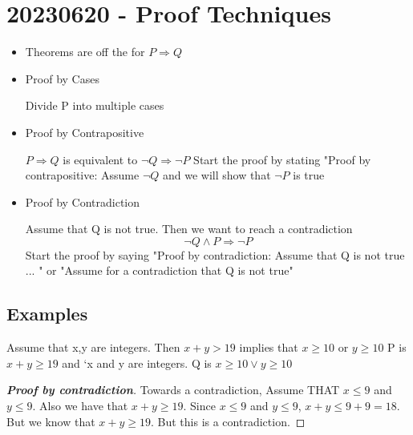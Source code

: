 \documentclass{report}
\begin{document}
\section*{20230620 - Proof Techniques}%
  \begin{itemize}
    \item Theorems are off the for $P \Longrightarrow Q$
    \item Proof by Cases

      Divide P into multiple cases

    \item Proof by Contrapositive

      $P \Longrightarrow Q $ is equivalent to $\neg Q \Longrightarrow \neg P$
      Start the proof by stating "Proof by contrapositive: Assume $\neg Q$
      and we will show that $\neg P$ is true

    \item Proof by Contradiction

      Assume that Q is not true.  Then we want to reach a contradiction
        \[ \neg Q \wedge P \Longrightarrow \neg P \]
      Start the proof by saying "Proof by contradiction:  Assume that
      Q is not true ... "  or "Assume for a contradiction that Q is not
      true"
  \end{itemize}

  \subsection*{Examples}%
  \ex{} {
     {
      Assume that x,y are integers.  Then $x+y > 19$ implies that
          $x \geq 10$ or $y \geq 10$
    }
    P is $x + y \geq 19$ and `x and y are integers.  Q is $x \geq 10 \vee
    y \geq 10$


      \renewcommand\qedsymbol{\Lightning}
      \begin{proof}[\textbf{Proof by contradiction}]  Towards a contradiction,
        Assume THAT $ x \leq 9$ and $y \leq 9$.  Also we have that
        $x + y \geq 19$.  Since $x \leq 9$ and $y \leq 9$,
        $x + y \leq 9 + 9 = 18$.  But we know that $x + y \geq 19$.  But
        this is a contradiction.
      \end{proof}
      \renewcommand\qedsymbol{$\square$}
  }
\end{document}
